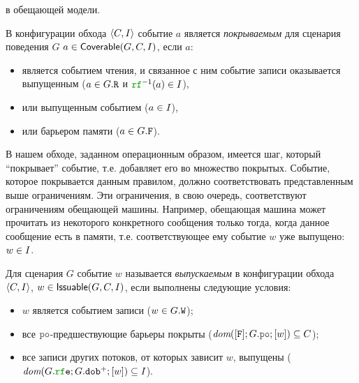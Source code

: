 в обещающей модели.
\begin{definition}
В конфигурации обхода ${\langle{C, I}\rangle}$ событие $a$ является \emph{покрываемым} для сценария поведения $G$
$a\in {\sf Coverable}(G, C, I)$, если $a$:
  \begin{itemize}
    \item является событием чтения, и связанное с ним событие записи оказывается выпущенным ($a \in G.{\mathtt{R}}$ и $\lRF^{-1}(a) \in \IssuedSet$),
    \item или выпущенным событием ($a \in I$),
    \item или барьером памяти ($a \in G.{\mathtt{F}}$).
  \end{itemize}
\end{definition}
В нашем обходе, заданном операционным образом, имеется шаг, который ``покрывает'' событие, т.е. добавляет
его во множество покрытых. Событие, которое покрывается данным правилом, должно соответствовать представленным выше ограничениям.
Эти ограничения, в свою очередь,  соответствуют ограничениям обещающей машины. Например, обещающая машина может 
прочитать из некоторого конкретного сообщения только тогда, когда данное сообщение есть в памяти,
т.е. соответствующее ему событие $w$ уже выпущено: $w \in I$.
\begin{definition}
Для сценария $G$ событие $w$ называется \emph{выпускаемым}
в конфигурации обхода ${\langle{C, I}\rangle}$,
$w\in{\sf Issuable}(G, C, I)$, если выполнены следующие условия:
      \begin{itemize}
        \item $w$ является событием записи ($w\in G.{\mathtt{W}}$);
        \item все $\lPO$-предшествующие барьеры покрыты
          ($\dom{[\lF];G.\lPO;[w]} \suq C$);
        \item все записи других потоков, от которых зависит $w$, выпущены
          ($\dom{G.\lRFE;G.\lDOB^{+};[w]} \suq \IssuedSet$).
      \end{itemize}
\end{definition}
